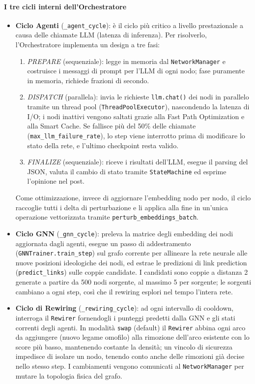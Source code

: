 \documentclass[11pt, a4paper]{article}
\begin{document}
\paragraph{I tre cicli interni dell'Orchestratore}
\begin{itemize}[leftmargin=*]
    \item \textbf{Ciclo Agenti} (\texttt{\_agent\_cycle}): è il ciclo più critico a livello prestazionale a causa delle chiamate LLM (latenza di inferenza). Per risolverlo, l'Orchestratore implementa un design a tre fasi:
    \begin{enumerate}
        \item \textit{PREPARE} (sequenziale): legge in memoria dal \texttt{NetworkManager} e costruisce i messaggi di prompt per l'LLM di ogni nodo; fase puramente in memoria, richiede frazioni di secondo.
        \item \textit{DISPATCH} (parallela): invia le richieste \texttt{llm.chat()} dei nodi in parallelo tramite un thread pool (\texttt{ThreadPoolExecutor}), nascondendo la latenza di I/O; i nodi inattivi vengono saltati grazie alla Fast Path Optimization e alla Smart Cache. Se fallisce più del 50\% delle chiamate (\texttt{max\_llm\_failure\_rate}), lo step viene interrotto prima di modificare lo stato della rete, e l'ultimo checkpoint resta valido.
        \item \textit{FINALIZE} (sequenziale): riceve i risultati dell'LLM, esegue il parsing del JSON, valuta il cambio di stato tramite \texttt{StateMachine} ed esprime l'opinione nel post.
    \end{enumerate}
    Come ottimizzazione, invece di aggiornare l'embedding nodo per nodo, il ciclo raccoglie tutti i delta di perturbazione e li applica alla fine in un'unica operazione vettorizzata tramite \texttt{perturb\_embeddings\_batch}.
    \item \textbf{Ciclo GNN} (\texttt{\_gnn\_cycle}): preleva la matrice degli embedding dei nodi aggiornata dagli agenti, esegue un passo di addestramento (\texttt{GNNTrainer.train\_step}) sul grafo corrente per allineare la rete neurale alle nuove posizioni ideologiche dei nodi, ed estrae le predizioni di link prediction (\texttt{predict\_links}) sulle coppie candidate. I candidati sono coppie a distanza 2 generate a partire da 500 nodi sorgente, al massimo 5 per sorgente; le sorgenti cambiano a ogni step, così che il rewiring esplori nel tempo l'intera rete.
    \item \textbf{Ciclo di Rewiring} (\texttt{\_rewiring\_cycle}): ad ogni intervallo di cooldown, interroga il \texttt{Rewirer} fornendogli i punteggi predetti dalla GNN e gli stati correnti degli agenti. In modalità \texttt{swap} (default) il \texttt{Rewirer} abbina ogni arco da aggiungere (nuovo legame omofilo) alla rimozione dell'arco esistente con lo score più basso, mantenendo costante la densità; un vincolo di sicurezza impedisce di isolare un nodo, tenendo conto anche delle rimozioni già decise nello stesso step. I cambiamenti vengono comunicati al \texttt{NetworkManager} per mutare la topologia fisica del grafo.
\end{itemize}
\end{document}
